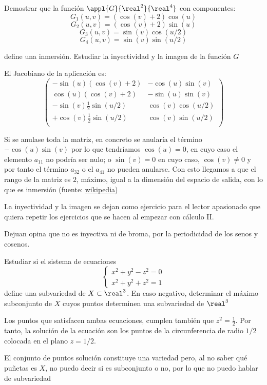 \begin{problem}[8]
Demostrar que la función $\appl{G}{\real^2}{\real^4}$ con componentes:
\[G_1(u,v)=(\cos(v)+2)\cos(u)\]
\[G_2(u,v)=(\cos(v)+2)\sin(u)\]
\[G_3(u,v)=\sin(v)\cos(u/2)\]
\[G_4(u,v)=\sin(v)\sin(u/2)\]

define una inmersión. Estudiar la inyectividad y la imagen de la función $G$
\solution

 

El Jacobiano de la aplicación es:
\[ \left( \begin{array}{cc}
-\sin(u)(\cos(v)+2) & -\cos(u)\sin(v) \\
\cos(u)(\cos(v)+2) & -\sin(u)\sin(v) \\
-\sin(v)\frac{1}{2}\sin(u/2) & \cos(v)\cos(u/2) \\
+\cos(v)\frac{1}{2}\sin(u/2) & \cos(v)\sin(u/2) \\ \end{array} \right)\]

Si se anulase toda la matriz, en concreto se anularía el término $-\cos(u)\sin(v)$ por lo que tendríamos $\cos(u)=0$, en cuyo caso el elemento $a_{11}$ no podría ser nulo; o $\sin(v)=0$ en cuyo caso, $\cos(v)\neq 0$ y por tanto el término $a_{32}$ o el $a_{41}$ no pueden anularse. Con esto llegamos a que el rango de la matriz es $2$, máximo, igual a la dimensión del espacio de salida, con lo que es inmersión (fuente: \href{http://es.wikipedia.org/wiki/Inmersi\%C3\%B3n_(matem\%C3\%A1ticas)}{wikipedia})

La inyectividad y la imagen se dejan como ejercicio para el lector apasionado que quiera repetir los ejercicios que se hacen al empezar con cálculo II.

Dejuan opina que no es inyectiva ni de broma,  por la periodicidad de los senos y cosenos.

\end{problem}

\begin{problem}[9]
Estudiar si el sistema de ecuaciones
\[ \left\{ \begin{array}{c}
x^2+y^2-z^2=0\\
x^2+y^2+z^2=1 \end{array} \right.\]
define una subvariedad de $X \subset \real^3$. En caso negativo, determinar el máximo subconjunto de $X$ cuyos puntos determinen una subvariedad de $\real^3$
\solution


Los puntos que satisfacen ambas ecuaciones, cumplen también que $z^2=\frac{1}{2}$. Por tanto, la solución de la ecuación son los puntos de la circunferencia de radio $1/2$ colocada en el plano $z=1/2$.

El conjunto de puntos solución constituye una variedad pero, al no saber qué puñetas es $X$, no puedo decir si es subconjunto o no, por lo que no puedo hablar de subvariedad

\end{problem}

